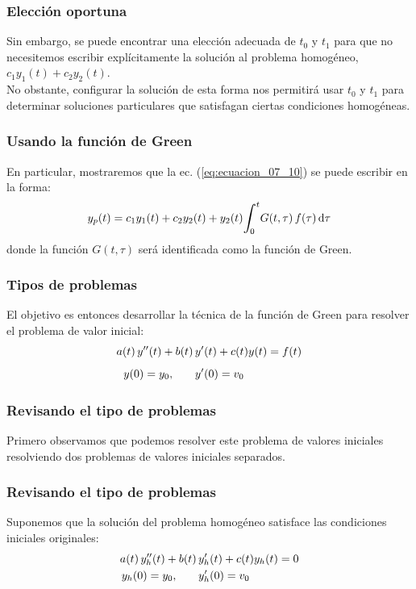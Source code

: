 \documentclass[12pt]{beamer}
\begin{document}
\begin{frame}
\frametitle{Elección oportuna}
Sin embargo, se puede encontrar una elección adecuada de $t_{0}$ y $t_{1}$ para que no necesitemos escribir explícitamente la solución al problema homogéneo, $c_{1} y_{1} (t) + c_{2} y_{2} (t)$. 
\\
\bigskip
\pause
No obstante, configurar la solución de esta forma nos permitirá usar $t_{0}$ y $t_{1}$ para determinar soluciones particulares que satisfagan ciertas condiciones homogéneas.
\end{frame}
\begin{frame}
\frametitle{Usando la función de Green}
En particular, mostraremos que la ec. (\ref{eq:ecuacion_07_10}) se puede escribir en la forma:
\pause
\begin{align}
y_{p} (t) = c_{1} y_{1} (t) + c_{2} y_{2} (t) +  y_{2} (t) \scaleint{6ex}_{\bs 0}^{t} G (t,\tau) \, f (\tau) \dd{\tau}
\label{eq:ecuacion_07_11}
\end{align}
donde la función $G (t, \tau)$ será identificada como la función de Green.
\end{frame}
\begin{frame}
\frametitle{Tipos de problemas}
El objetivo es entonces desarrollar la técnica de la función de Green para resolver el problema de valor inicial:
\pause
\begin{eqnarray}
\begin{aligned}
a (t) \, {y}^{\prime \prime} (t) + b (t) \, &{y}^{\prime} (t) + c (t) y(t) = f (t) \\[0.5em]
y (0) = y_{0}, \hspace{0.7cm} &{y}^{\prime} (0) = v_{0}
\end{aligned}
\label{eq:ecuacion_07_12}
\end{eqnarray}
\end{frame}
\begin{frame}
\frametitle{Revisando el tipo de problemas}
Primero observamos que podemos resolver este problema de valores iniciales resolviendo dos problemas de valores iniciales separados.
\end{frame}
\begin{frame}
\frametitle{Revisando el tipo de problemas}
Suponemos que la solución del problema homogéneo satisface las condiciones iniciales originales:
\pause
\begin{eqnarray}
\begin{aligned}
a (t) \, {y}^{\prime \prime}_{h} (t) + b (t) \, &{y}^{\prime}_{h} (t) + c (t) y_{h} (t) = 0 \\
y_{h} (0) = y_{0}, \hspace{0.7cm} &{y}^{\prime}_{h} (0) = v_{0}
\end{aligned}
\label{eq:ecuacion_07_13}
\end{eqnarray}
\end{frame}
\end{document}

